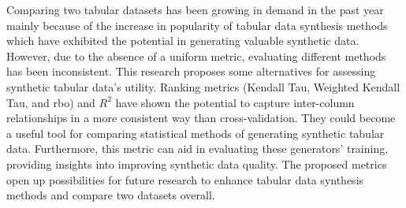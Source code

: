 
Comparing two tabular datasets has been growing in demand in the past year mainly because of the increase in popularity of tabular data synthesis methods which have exhibited the potential in generating valuable synthetic data. However, due to the absence of a uniform metric, evaluating different methods has been inconsistent. This research proposes some alternatives for assessing synthetic tabular data's utility. Ranking metrics (Kendall Tau, Weighted Kendall Tau, and \ac{rbo}) and $R^2$ have shown the potential to capture inter-column relationships in a more consistent way than cross-validation. They could become a useful tool for comparing statistical methods of generating synthetic tabular data. Furthermore, this metric can aid in evaluating these generators' training, providing insights into improving synthetic data quality. The proposed metrics open up possibilities for future research to enhance tabular data synthesis methods and compare two datasets overall.